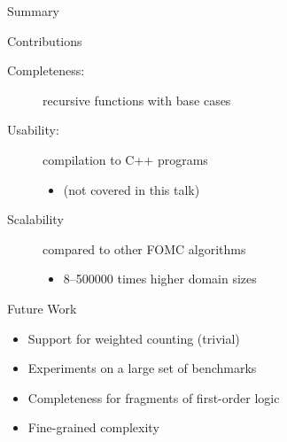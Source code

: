 \documentclass{beamer}
\begin{document}
\begin{frame}{Summary}
  \begin{block}{Contributions}
    \begin{description}
      \item[Completeness:] recursive functions with base cases
      \item[Usability:] compilation to C++ programs
            \begin{itemize}
              \item (not covered in this talk)
            \end{itemize}
      \item[Scalability] compared to other FOMC algorithms
            \begin{itemize}
              \item \numrange{8}{500000} times higher domain sizes
            \end{itemize}
    \end{description}
  \end{block}
  \pause
  \begin{block}{Future Work}
    \begin{itemize}
      \item Support for weighted counting (trivial)
      \item Experiments on a large set of benchmarks
      \item Completeness for fragments of first-order logic
      \item Fine-grained complexity
    \end{itemize}
  \end{block}
\end{frame}
\end{document}
